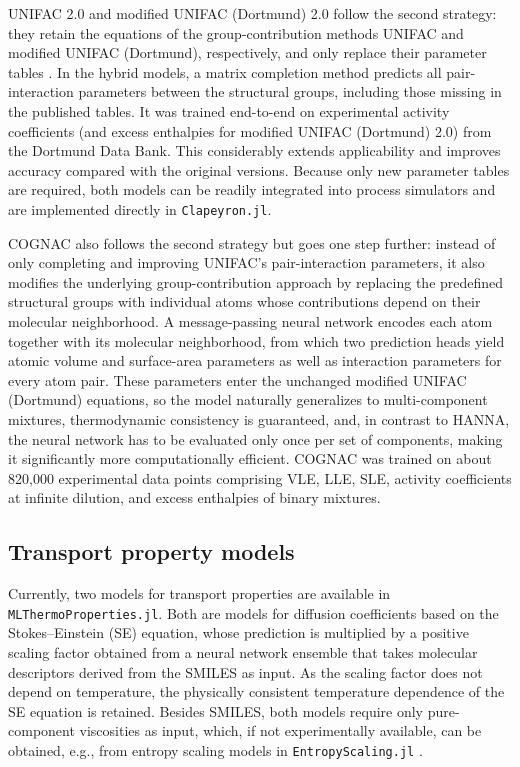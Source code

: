 \documentclass{juliacon}
\begin{document}
UNIFAC 2.0 and modified UNIFAC (Dortmund) 2.0 follow the second strategy: they retain the equations of the group-contribution methods UNIFAC and modified UNIFAC (Dortmund), respectively, and only replace their parameter tables \cite{hayer_advancing_2025,hayer_modified_2025}.
In the hybrid models, a matrix completion method predicts all pair-interaction parameters between the structural groups, including those missing in the published tables. It was trained end-to-end on experimental activity coefficients (and excess enthalpies for modified UNIFAC (Dortmund) 2.0) from the Dortmund Data Bank.
This considerably extends applicability and improves accuracy compared with the original versions.
Because only new parameter tables are required, both models can be readily integrated into process simulators and are implemented directly in \texttt{Clapeyron.jl}.

COGNAC \cite{hoffmann_learning_2026} also follows the second strategy but goes one step further: instead of only completing and improving UNIFAC's pair-interaction parameters, it also modifies the underlying group-contribution approach by replacing the predefined structural groups with individual atoms whose contributions depend on their molecular neighborhood.
A message-passing neural network encodes each atom together with its molecular neighborhood, from which two prediction heads yield atomic volume and surface-area parameters as well as interaction parameters for every atom pair.
These parameters enter the unchanged modified UNIFAC (Dortmund) equations, so the model naturally generalizes to multi-component mixtures, thermodynamic consistency is guaranteed, and, in contrast to HANNA, the neural network has to be evaluated only once per set of components, making it significantly more computationally efficient.
COGNAC was trained on about 820,000 experimental data points comprising VLE, LLE, SLE, activity coefficients at infinite dilution, and excess enthalpies of binary mixtures.

\subsection{Transport property models} \label{sec:transport}

Currently, two models for transport properties are available in \texttt{MLThermoProperties.jl}.
Both are models for diffusion coefficients based on the Stokes--Einstein (SE) equation, whose prediction is multiplied by a positive scaling factor obtained from a neural network ensemble that takes molecular descriptors derived from the SMILES as input.
As the scaling factor does not depend on temperature, the physically consistent temperature dependence of the SE equation is retained.
Besides SMILES, both models require only pure-component viscosities as input, which, if not experimentally available, can be obtained, e.g., from entropy scaling models in \texttt{EntropyScaling.jl} \cite{schmitt_entropy_2024}.
\end{document}
